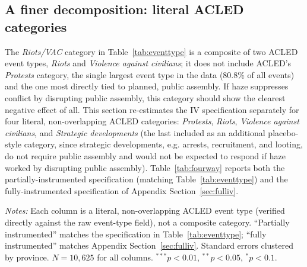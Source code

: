 \documentclass[12pt]{article}
\begin{document}
\subsection{A finer decomposition: literal ACLED categories}
\label{sec:fourway}

The \emph{Riots/VAC} category in Table~\ref{tab:eventtype} is a composite of two ACLED event types, \emph{Riots} and \emph{Violence against civilians}; it does not include ACLED's \emph{Protests} category, the single largest event type in the data (80.8\% of all events) and the one most directly tied to planned, public assembly. If haze suppresses conflict by disrupting public assembly, this category should show the clearest negative effect of all. This section re-estimates the IV specification separately for four literal, non-overlapping ACLED categories: \emph{Protests}, \emph{Riots}, \emph{Violence against civilians}, and \emph{Strategic developments} (the last included as an additional placebo-style category, since strategic developments, e.g. arrests, recruitment, and looting, do not require public assembly and would not be expected to respond if haze worked by disrupting public assembly). Table~\ref{tab:fourway} reports both the partially-instrumented specification (matching Table~\ref{tab:eventtype}) and the fully-instrumented specification of Appendix Section~\ref{sec:fulliv}.

\begin{table}[H]
\centering
\caption{Four-way event-type decomposition, literal ACLED categories, $\tau \geq 30\%$ sample}
\label{tab:fourway}
\begin{minipage}{0.95\textwidth}
\vspace{4pt}
\footnotesize \emph{Notes:} Each column is a literal, non-overlapping ACLED event type (verified directly against the raw event-type field), not a composite category. ``Partially instrumented'' matches the specification in Table~\ref{tab:eventtype}; ``fully instrumented'' matches Appendix Section~\ref{sec:fulliv}. Standard errors clustered by province. $N=10{,}625$ for all columns. $^{***}p<0.01$, $^{**}p<0.05$, $^{*}p<0.1$.
\end{minipage}
\end{table}
\end{document}
